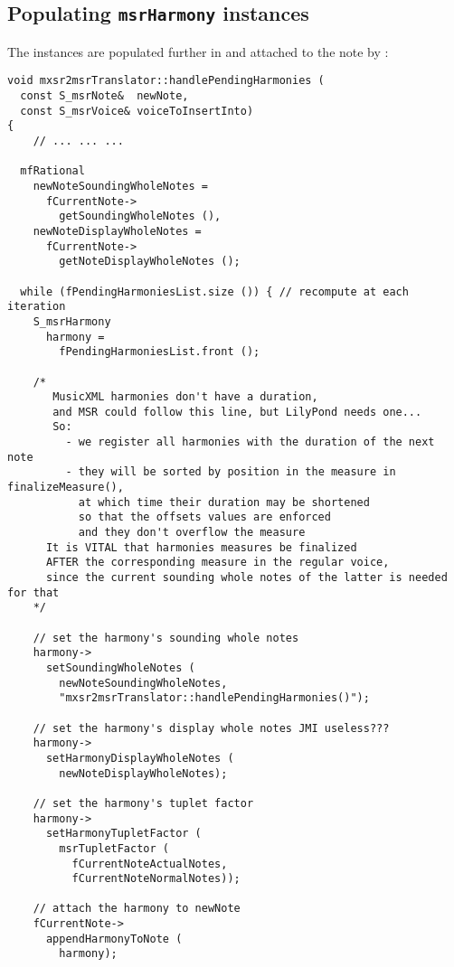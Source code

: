\subsection{Populating {\tt msrHarmony} instances}

The  instances are populated further in  and attached to the note by : %
\begin{lstlisting}[language=CPlusPlus]
void mxsr2msrTranslator::handlePendingHarmonies (
  const S_msrNote&  newNote,
  const S_msrVoice& voiceToInsertInto)
{
	// ... ... ...

  mfRational
    newNoteSoundingWholeNotes =
      fCurrentNote->
        getSoundingWholeNotes (),
    newNoteDisplayWholeNotes =
      fCurrentNote->
        getNoteDisplayWholeNotes ();

  while (fPendingHarmoniesList.size ()) { // recompute at each iteration
    S_msrHarmony
      harmony =
        fPendingHarmoniesList.front ();

    /*
       MusicXML harmonies don't have a duration,
       and MSR could follow this line, but LilyPond needs one...
       So:
         - we register all harmonies with the duration of the next note
         - they will be sorted by position in the measure in finalizeMeasure(),
           at which time their duration may be shortened
           so that the offsets values are enforced
           and they don't overflow the measure
      It is VITAL that harmonies measures be finalized
      AFTER the corresponding measure in the regular voice,
      since the current sounding whole notes of the latter is needed for that
    */

    // set the harmony's sounding whole notes
    harmony->
      setSoundingWholeNotes (
        newNoteSoundingWholeNotes,
        "mxsr2msrTranslator::handlePendingHarmonies()");

    // set the harmony's display whole notes JMI useless???
    harmony->
      setHarmonyDisplayWholeNotes (
        newNoteDisplayWholeNotes);

    // set the harmony's tuplet factor
    harmony->
      setHarmonyTupletFactor (
        msrTupletFactor (
          fCurrentNoteActualNotes,
          fCurrentNoteNormalNotes));

    // attach the harmony to newNote
    fCurrentNote->
      appendHarmonyToNote (
        harmony);


\end{lstlisting}
